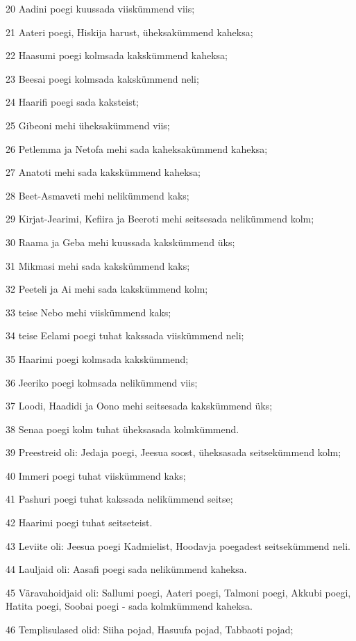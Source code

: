 \par 20 Aadini poegi kuussada viiskümmend viis;
\par 21 Aateri poegi, Hiskija harust, üheksakümmend kaheksa;
\par 22 Haasumi poegi kolmsada kakskümmend kaheksa;
\par 23 Beesai poegi kolmsada kakskümmend neli;
\par 24 Haarifi poegi sada kaksteist;
\par 25 Gibeoni mehi üheksakümmend viis;
\par 26 Petlemma ja Netofa mehi sada kaheksakümmend kaheksa;
\par 27 Anatoti mehi sada kakskümmend kaheksa;
\par 28 Beet-Asmaveti mehi nelikümmend kaks;
\par 29 Kirjat-Jearimi, Kefiira ja Beeroti mehi seitsesada nelikümmend kolm;
\par 30 Raama ja Geba mehi kuussada kakskümmend üks;
\par 31 Mikmasi mehi sada kakskümmend kaks;
\par 32 Peeteli ja Ai mehi sada kakskümmend kolm;
\par 33 teise Nebo mehi viiskümmend kaks;
\par 34 teise Eelami poegi tuhat kakssada viiskümmend neli;
\par 35 Haarimi poegi kolmsada kakskümmend;
\par 36 Jeeriko poegi kolmsada nelikümmend viis;
\par 37 Loodi, Haadidi ja Oono mehi seitsesada kakskümmend üks;
\par 38 Senaa poegi kolm tuhat üheksasada kolmkümmend.
\par 39 Preestreid oli: Jedaja poegi, Jeesua soost, üheksasada seitsekümmend kolm;
\par 40 Immeri poegi tuhat viiskümmend kaks;
\par 41 Pashuri poegi tuhat kakssada nelikümmend seitse;
\par 42 Haarimi poegi tuhat seitseteist.
\par 43 Leviite oli: Jeesua poegi Kadmielist, Hoodavja poegadest seitsekümmend neli.
\par 44 Lauljaid oli: Aasafi poegi sada nelikümmend kaheksa.
\par 45 Väravahoidjaid oli: Sallumi poegi, Aateri poegi, Talmoni poegi, Akkubi poegi, Hatita poegi, Soobai poegi - sada kolmkümmend kaheksa.
\par 46 Templisulased olid: Siiha pojad, Hasuufa pojad, Tabbaoti pojad;
